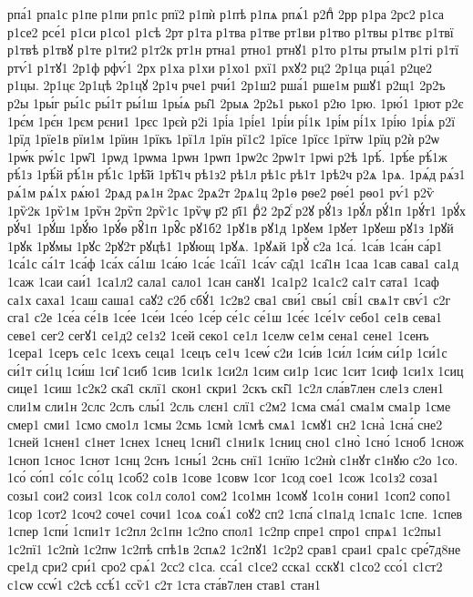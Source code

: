 {рпа́1
рпа1с
р1пе
р1пи
рп1с
рпї2
р1пѝ
р1пѣ
р1пѧ
рпѧ́1
р2пⷣ
2рр
р1ра
2рс2
р1са
р1се2
рсе́1
р1си
р1со1
р1сѣ
2рт
р1та
р1тва
р1тве
рт1ви
р1тво
р1твы
р1твє
р1твї
р1твѣ
р1твꙋ
р1те
р1ти2
р1т2к
рт1н
ртна1
ртно1
ртнꙋ1
р1то
р1ты
рты1м
р1ті
р1тї
ртѵ́1
р1тꙋ1
2р1ф
рфѵ́1
2рх
р1ха
р1хи
р1хо1
рхї1
рхꙋ2
рц2
2р1ца
рца́1
р2це2
р1цы.
2р1цє
2р1цѣ
2р1цꙋ
2р1ч
рче1
рчи́1
2р1ш2
рша́1
рше1м
ршꙋ1
р2щ1
2р2ъ
р2ы
1ры́г
ры́1с
ры́1т
ры́1ш
1ры́ѧ
ры̑1
2рыѧ
2р2ь1
рько1
р2ю
1рю.
1рю́1
1рют
р2є
1рє́м
1рє́н
1рєм
рєни1
1рєс
1рєѝ
р2і
1рі́а
1рі́е1
1рі́и
рі́1к
1рі́м
рі́1х
1рі́ю
1рі́ѧ
р2ї
1рїд
1рїе1в
рїи1м
1рїин
1рїкъ
1рї1л
1рїн
рї1с2
1рїсе
1рїсє
1рїтѡ
1рїц
р2ѝ
р2ѡ
1рѡ́к
рѡ́1с
1рѡ̑1
1рѡд
1рѡма
1рѡн
1рѡп
1рѡ2с
2рѡ1т
1рѡі
р2ѣ
1рѣ́.
1рѣ́е
рѣ́1ж
рѣ́1з
1рѣ́й
рѣ́1н
рѣ́1с
1рѣ̑й
1рѣ̑1ч
рѣ1з2
рѣ1л
рѣ1с
рѣ1т
1рѣ2ч
р2ѧ
1рѧ.
1рѧ́д
рѧ́з1
рѧ́1м
рѧ́1х
рѧ́ю1
2рѧд
рѧ1н
2рѧс
2рѧ2т
2рѧ1ц
2р1ѳ
рѳе2
рѳе́1
рѳо1
рѵ́1
р2ѷ
1рѷ2к
1рѷ1м
1рѷн
2рѷп
2рѷ1с
1рѷѱ
р҃2
р҃ї1
рⷣ2
2р2ⷭ
р2ꙋ
рꙋ́1з
1рꙋ́л
рꙋ́1п
1рꙋ́т1
1рꙋ́х
рꙋ́ч1
1рꙋ́ш
1рꙋ́ю
1рꙋ́ѳ
рꙋ̑1п
1рꙋ̑с
рꙋ1б2
1рꙋ1в
рꙋ1д
1рꙋем
1рꙋет
1рꙋеш
рꙋ1з
1рꙋй
1рꙋк
1рꙋмы
1рꙋс
2рꙋ2т
рꙋцѣ1
1рꙋющ
1рꙋѧ.
1рꙋѧй
1рꙋⷯ
с2а
1са́.
1са́в
1са́н
са́р1
1са́1с
са́1т
1са́ф
1са́х
са́1ш
1са́ю
1са́є
1са́ї1
1са́ѵ
са̑д1
1са̑1н
1саа
1сав
сава1
са1д
1саж
1саи
саи́1
1са1л2
сала1
сало1
1сан
санꙋ1
1са1р2
1са1с2
са1т
сата1
1саф
са1х
саха1
1саш
саша1
саꙋ2
с2б
сбꙋ́1
1с2в2
сва1
сви́1
свы́1
сві́1
свѧ1т
свѵ́1
с2г
сга1
с2е
1се́а
се́1в
1се́е
1се́и
1се́о
1се́р
се́1с
се́1ш
1се́є
1се́1ѵ
себо1
се1в
сева1
севе1
сег2
сегꙋ1
се1д2
се1з2
1сей
секо1
се1л
1селѡ
се1м
сена1
сене1
1сенъ
1сера1
1серъ
се1с
1сехъ
сеца1
1сецъ
се1ч
1сеѡ́
с2и
1си́в
1си́л
1си́м
си́1р
1си́1с
си́1т
си́1ц
1си́ш
1си̑
1сиб
1сив
1си1к
1си2л
1сим
си1р
1сис
1сит
1сиф
1си1х
1сиц
сице1
1сиш
1с2к2
ска̑1
склї1
скон1
скри1
2скъ
скі̑1
1с2л
сла́в7лен
сле1з
слен1
сли1м
сли1н
2слс
2слъ
слы́1
2сль
слєн1
слї1
с2м2
1сма
сма́1
сма1м
сма1р
1сме
смер1
сми1
1смо
смо1л
1смы
2смь
1смѝ
1смѣ
смѧ1
1смꙋ1
сн2
1сна̀
1сна́
сне2
1сней
1снен1
с1нет
1снех
1снец
1сни̑1
с1ни1к
1сниц
сно1
с1но̀
1сно́
1сноб
1снож
1сноп
1снос
1снот
1снц
2снъ
1сны́1
2снь
снї1
1снїю
1с2нѝ
с1нꙋт
с1нꙋю
с2о
1со.
1со́
со́п1
со́1с
со́1ц
1соб2
со1в
1сове
1совѡ
1сог
1сод
сое1
1сож
1со1з2
соза1
созы1
сои2
соиз1
1сок
со1л
соло1
сом2
1со1мн
1сомꙋ
1со1н
сони1
1соп2
сопо1
1сор
1сот2
1соч2
соче1
сочи1
1соѧ
соѧ́1
соꙋ2
сп2
1спа́
с1па1д
1спа1с
1спе.
1спев
1спер
1спи́
1спи1т
1с2пл
2с1пн
1с2по
спол1
1с2пр
спре1
спро1
спрѧ1
1с2пы1
1с2пї1
1с2пѝ
1с2пѡ
1с2пѣ
спѣ1в
2спѧ2
1с2пꙋ1
1с2р2
срав1
сраи1
сра1с
сре́7д8не
сре1д
сри2
сри́1
сро2
срѧ́1
2сс2
с1са.
сса́1
с1се2
сска1
сскꙋ1
с1со2
ссо́1
с1ст2
с1сѡ
ссѡ́1
с2сѣ
ссѣ́1
ссѷ1
с2т
1ста
ста́в7лен
став1
стан1
}
